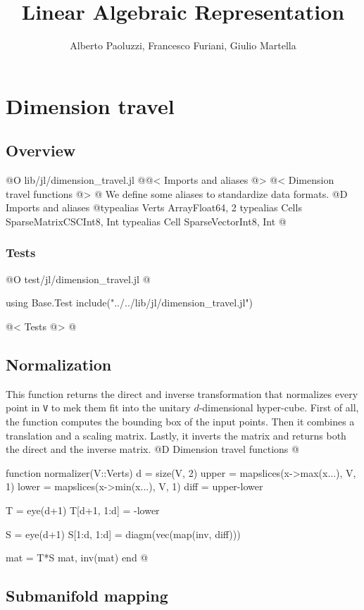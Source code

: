 \documentclass[10pt]{book}
\author{Alberto Paoluzzi, Francesco Furiani, Giulio Martella}
\title{Linear Algebraic Representation}
\begin{document}
\frontmatter
\maketitle
\tableofcontents

\mainmatter

\chapter{Dimension travel}

\section{Overview}
@O lib/jl/dimension_travel.jl
@{@< Imports and aliases @>
@< Dimension travel functions @>
@}
We define some aliases to standardize data formats.
@D Imports and aliases
@{typealias Verts Array{Float64, 2}
typealias Cells SparseMatrixCSC{Int8, Int}
typealias Cell SparseVector{Int8, Int}
@}
\subsection{Tests}
@O test/jl/dimension_travel.jl
@{using Base.Test
include("../../lib/jl/dimension_travel.jl")

@< Tests @>
@}


\section{Normalization}
This function returns the direct and inverse transformation that
normalizes every point in \texttt{V} to mek them fit into the unitary
$d$-dimensional hyper-cube.
First of all, the function computes the bounding box of the input points.
Then it combines a translation and a scaling matrix. Lastly, it
inverts the matrix and returns both the direct and the inverse matrix.
@D Dimension travel functions
@{function normalizer(V::Verts)
    d = size(V, 2)
    upper = mapslices(x->max(x...), V, 1)
    lower = mapslices(x->min(x...), V, 1)
    diff = upper-lower

    T = eye(d+1)
    T[d+1, 1:d] = -lower

    S = eye(d+1)
    S[1:d, 1:d] = diagm(vec(map(inv, diff)))

    mat = T*S
    mat, inv(mat)
end
@}


\section{Submanifold mapping}
\end{document}
